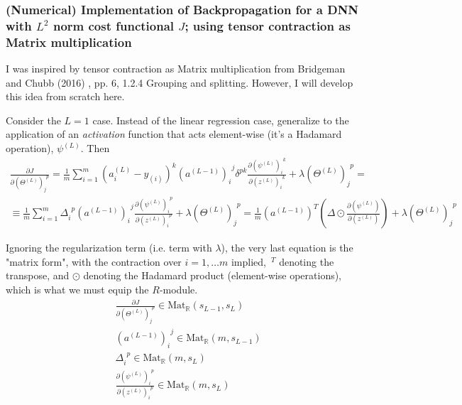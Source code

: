 \documentclass[10pt]{amsart}
\begin{document}
\begin{multicols*}{2}
\subsubsection{(Numerical) Implementation of Backpropagation for a DNN with $L^2$ norm cost functional $J$; using tensor contraction as Matrix multiplication}

I was inspired by tensor contraction as Matrix multiplication from Bridgeman and Chubb (2016) \cite{BrCh2016}, pp. 6, 1.2.4 Grouping and splitting.  However, I will develop this idea from scratch here.  

Consider the $L=1$ case.  Instead of the linear regression case, generalize to the application of an \emph{activation} function that acts element-wise (it's a Hadamard operation), $\psi^{(L)}$.  Then
\[
\begin{gathered}
\frac{ \partial J}{ \partial (\Theta^{(L)})_j^{\  \  p} } = \frac{1}{m} \sum_{i=1}^m (a_i^{(L)} - y_{(i)})^k (a^{(L-1)})_i^{\  \  j} \delta^{pk} \frac{ \partial (\psi^{(L)})_i^{\  \  k} }{ \partial (z^{(L)})_i^{\  \  k} } + \lambda (\Theta^{(L)})_j^{\  \  p}  = \\
\equiv \frac{1}{m} \sum_{i=1}^m \Delta_i^{\  \   p} (a^{(L-1)})_i^{\  \  j} \frac{ \partial ( \psi^{(L)})_i^{\  \  p} }{ \partial (z^{(L)})_i^{\  \  p} } + \lambda (\Theta^{(L)})_j^{\  \  p} = \frac{1}{m} (a^{(L-1)})^T \left( \Delta \odot \frac{ \partial (\psi^{(L)}) }{ \partial (z^{(L)})}  \right) + \lambda (\Theta^{(L)})_j^{\  \  p}
\end{gathered}
\]

Ignoring the regularization term (i.e. term with $\lambda$), the very last equation is the "matrix form", with the contraction over $i=1, \dots m$ implied, ${\, }^T$ denoting the transpose, and $\odot$ denoting the Hadamard product (element-wise operations), which is what we must equip the $R$-module.  
\[
\begin{aligned}
& \frac{\partial J}{ \partial (\Theta^{(L)})_j^{\  \  p}} \in \text{Mat}_{\mathbb{R} }(s_{L-1}, s_L) \\ 
& (a^{(L-1)})_i^{\  \ j } \in \text{Mat}_{\mathbb{R}}(m,s_{L-1}) \\
& \Delta_i^{\  \  p} \in \text{Mat}_{\mathbb{R}}(m,s_L) \\ 
& \frac{ \partial (\psi^{(L)})_i^{\  \  p} }{ \partial (z^{(L)})_i^{\  \  p} } \in \text{Mat}_{\mathbb{R}}(m,s_L) 
\end{aligned}
\]


\end{multicols*}
\end{document}
